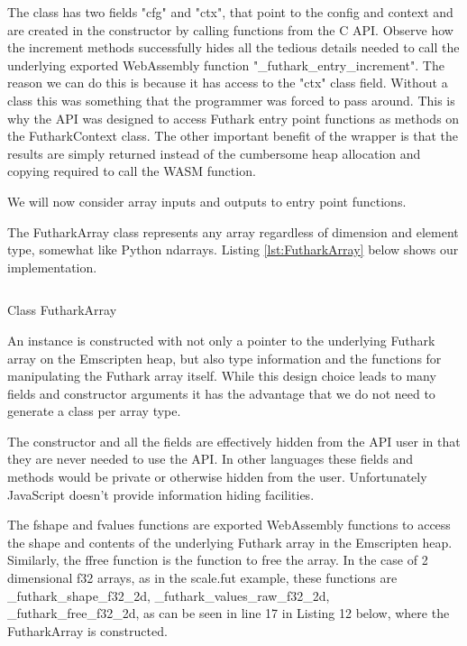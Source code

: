 \documentclass[11pt]{book}
\begin{document}
The class has two fields "cfg" and "ctx", that point to the config and context and are created in the constructor by calling functions from the C API. Observe how the increment methods successfully hides all the tedious details needed to call the underlying exported WebAssembly function "\_futhark\_entry\_increment". The reason we can do this is because it has access to the "ctx" class field. Without a class this was something that the programmer was forced to pass around. This is why the API was designed to access Futhark entry point functions as methods on the FutharkContext class. The other important benefit of the wrapper is that the results are simply returned instead of the cumbersome heap allocation and copying required to call the WASM function.


We will now consider array inputs and outputs to entry point functions. 

The FutharkArray class represents any array regardless of dimension and element type, somewhat like Python ndarrays. Listing \ref{lst:FutharkArray} below shows our implementation.


\begin{listing}[H] 
        \inputminted[fontsize=\small,baselinestretch=0.5,linenos]{JavaScript}{code/compiler/api_examples/FutharkArray.js}
        \caption{Class FutharkArray}
        \label{lst:FutharkArray}    
\end{listing} 

An instance is constructed with not only a pointer to the underlying Futhark array on the Emscripten heap, but also type information and the functions for manipulating the Futhark array itself. 
While this design choice leads to many fields and constructor arguments it has the advantage that we do not need to generate a class per array type.

The constructor and all the fields are effectively hidden from the API user in that they are never needed to use the API. In other languages these fields and methods would be private or otherwise hidden from the user. Unfortunately JavaScript doesn't provide information hiding facilities.

The fshape and fvalues functions are exported WebAssembly functions to access the shape and contents of the underlying Futhark array in the Emscripten heap. Similarly, the ffree function is the function to free the array. In the case of 2 dimensional f32 arrays, as in the scale.fut example, these functions are _futhark_shape_f32_2d, _futhark_values_raw_f32_2d, _futhark_free_f32_2d, as can be seen in line 17 in Listing 12 below, where the FutharkArray is constructed.
\end{document}
